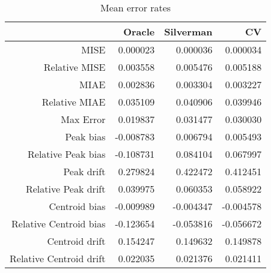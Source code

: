 \begin{table}[ht]
\centering
\begin{tabular}{rrrr}
  \hline
 & Oracle & Silverman & CV \\ 
  \hline
MISE & 0.000023 & 0.000036 & 0.000034 \\ 
  Relative MISE & 0.003558 & 0.005476 & 0.005188 \\ 
  MIAE & 0.002836 & 0.003304 & 0.003227 \\ 
  Relative MIAE & 0.035109 & 0.040906 & 0.039946 \\ 
  Max Error & 0.019837 & 0.031477 & 0.030030 \\ 
  Peak bias & -0.008783 & 0.006794 & 0.005493 \\ 
  Relative Peak bias & -0.108731 & 0.084104 & 0.067997 \\ 
  Peak drift & 0.279824 & 0.422472 & 0.412451 \\ 
  Relative Peak drift & 0.039975 & 0.060353 & 0.058922 \\ 
  Centroid bias & -0.009989 & -0.004347 & -0.004578 \\ 
  Relative Centroid bias & -0.123654 & -0.053816 & -0.056672 \\ 
  Centroid drift & 0.154247 & 0.149632 & 0.149878 \\ 
  Relative Centroid drift & 0.022035 & 0.021376 & 0.021411 \\ 
   \hline
\end{tabular}
\caption{Mean error rates} 
\label{tbl:mean_error_rates}
\end{table}
